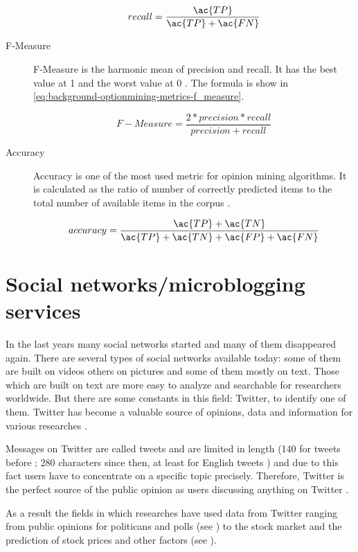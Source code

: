 \begin{description}
		\begin{equation}
			recall = \frac{\ac{TP}}{\ac{TP}+\ac{FN}}
			\label{eq:background-optionmining-metrics-recall}
		\end{equation}

	\item [F-Measure]
		F-Measure is the harmonic mean of precision and recall.
		It has the best value at 1 and the worst value at 0
		\citep{Tripathy2015}.
		The formula is show in \cref{eq:background-optionmining-metrics-f_measure}.

		\begin{equation}
			F-Measure = \frac{2 * precision * recall}{precision + recall}
			\label{eq:background-optionmining-metrics-f_measure}
		\end{equation}

	\item [Accuracy]
		Accuracy is one of the most used metric for opinion mining algorithms.
		It is calculated as the ratio of number of correctly predicted items to the total number of available items in the corpus
		\citep{Tripathy2015}.

		\begin{equation}
			accuracy = \frac{\ac{TP} + \ac{TN}}{\ac{TP}+ \ac{TN} + \ac{FP} + \ac{FN}}
			\label{eq:background-optionmining-metrics-accuracy}
		\end{equation}

\end{description}

\section{Social networks/microblogging services}
\label{s:background-socialnetworks}

In the last years many social networks started and many of them disappeared again.
There are several types of social networks available today: some of them are built on videos others on pictures and some of them mostly on text.
Those which are built on text are more easy to analyze and searchable for researchers worldwide.
But there are some constants in this field: Twitter, to identify one of them.
Twitter has become a valuable source of opinions, data and information for various researches \citep{Barbosa2010}.

Messages on Twitter are called tweets and are limited in length (140 for tweets before ; 280 characters since then, at least for English tweets \citep{Rosen2017}) and due to this fact users have to concentrate on a specific topic precisely.
Therefore, Twitter is the perfect source of the public opinion as users discussing anything on Twitter \citep{Pagolu2016a, Patodkar2016a}.

As a result the fields in which researches have used data from Twitter ranging from public opinions for politicans and polls (see \citealp{Oconnor2010a,Patodkar2016a}) to the stock market and the prediction of stock prices and other factors (see \citealp{Bollen2011a,Mittal2012a,Nguyen2015a,Pagolu2016a,Zhang2011a}).